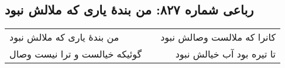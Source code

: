 \begin{center}
\section*{رباعی شماره ۸۲۷: من بندهٔ یاری که ملالش نبود}
\label{sec:0827}
\begin{longtable}{l p{0.5cm} r}
من بندهٔ یاری که ملالش نبود
&&
کانرا که ملالست وصالش نبود
\\
گوئیکه خیالست و ترا نیست وصال
&&
تا تیره بود آب خیالش نبود
\\
\end{longtable}
\end{center}
